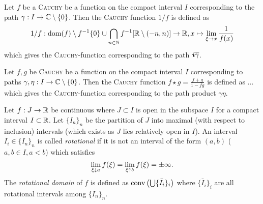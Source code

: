 \message{ !name(On The Routh-Hurwitz Theorem.tex)}\documentclass[10pt,a4paper]{article}
\begin{document}
\begin{definition}
Let $f$ be a \textsc{Cauchy} be a function on the compact interval $I$ corresponding to the path $\gamma:I\rightarrow\mathbb{C}\setminus\{0\}$. Then the \textsc{Cauchy} function $1/f$ is defined as
\begin{equation}
1/f:\operatorname{dom}(f)\setminus f^{-1}\{0\}\cup \bigcap_{n\in\mathbb{N}}f^{-1}[\mathbb{R}\setminus (-n,n)]\rightarrow\mathbb{R},x\mapsto\lim_{\xi\rightarrow x}{\frac{1}{f(x)}}
\end{equation}
which gives the \textsc{Cauchy}-function corresponding to the path $\boldsymbol{i}\overline{\gamma}$.
\end{definition}

\begin{definition}
Let $f,g$ be \textsc{Cauchy} be a function on the compact interval $I$ corresponding to paths $\gamma,\eta:I\rightarrow\mathbb{C}\setminus\{0\}$. Then the \textsc{Cauchy} function $f\star g=\frac{f+g}{1-fg}$ is defined as
...
which gives the \textsc{Cauchy}-function corresponding to the path product $\gamma\eta$.
\end{definition}




\begin{definition}
Let $f:J\rightarrow\mathbb{R}$ be continuous where $J\subset I$ is open in the subspace $I$ for a compact interval $I\subset\mathbb{R}$. Let $\{I_n\}_n$ be the partition of $J$ into maximal (with respect to inclusion) intervals (which exists as $J$ lies relatively open in $I$). An interval $I_i\in\{I_n\}_n$ is called \emph{rotational} if it is not an interval of the form $(a,b)$ ($a,b\in I, a<b$) which satisfies
\begin{equation}
\lim_{\xi\downarrow a}{f(\xi)}=\lim_{\xi\uparrow b}{f(\xi)}=\pm\infty\text{.}
\end{equation}
The \emph{rotational domain} of $f$ is defined as $\operatorname{conv}\left(\bigcup\{\bar{I}_i\}_i\right)$ where $\{\bar{I}_i\}_i$ are all rotational intervals among $\{I_n\}_n$.
\end{definition}

\end{document}
